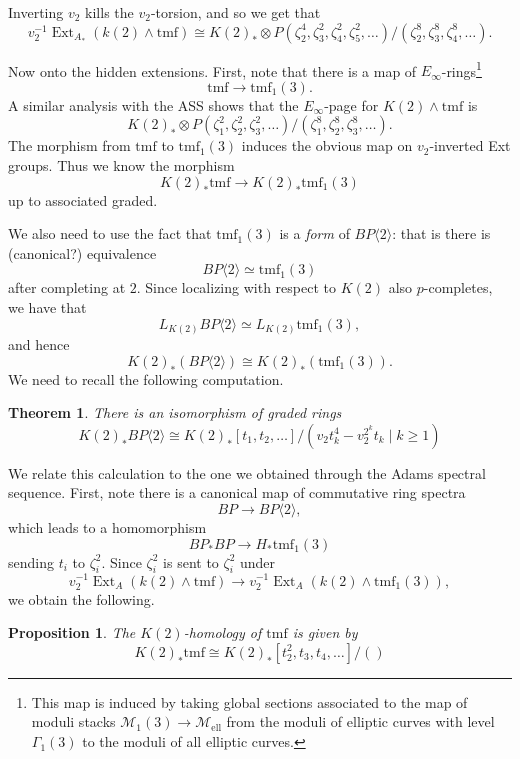\documentclass[12pt]{amsart}
\newcommand{\bra}[1]{\langle #1 \rangle}
\newcommand{\tBP}[1]{BP\bra{#1}}
\newcommand{\tmf}{\mathrm{tmf}}
\DeclareMathOperator{\Ext}{Ext}
\newcommand{\Mell}{\mathscr{M}_{\text{ell}}}
\newcommand{\M}{\mathscr{M}}
\newtheorem{thm}[equation]{Theorem}
\newtheorem{prop}[equation]{Proposition}
\theoremstyle{definition}
\numberwithin{equation}{section}
\numberwithin{figure}{section}
\begin{document}
Inverting $v_2$ kills the $v_2$-torsion, and so we get that 
\[
v_2^{-1}\Ext_{A_*}(k(2)\wedge \tmf)\cong K(2)_*\otimes P(\zeta_2^4, \zeta_3^2, \zeta_4^2, \zeta_5^2, \ldots)/(\zeta_2^8, \zeta_3^8, \zeta_4^8, \ldots).
\]

Now onto the hidden extensions. First, note that there is a map of $E_\infty$-rings\footnote{This map is induced by taking global sections associated to the map of moduli stacks $\M_1(3)\to \Mell$ from the moduli of elliptic curves with level $\Gamma_1(3)$ to the moduli of all elliptic curves.}
\[
\tmf\to \tmf_1(3).
\]
A similar analysis with the ASS shows that the $E_\infty$-page for $K(2)\wedge \tmf$ is
\[
K(2)_*\otimes P(\zeta_1^2, \zeta_2^2, \zeta_3^2, \ldots)/(\zeta_1^8, \zeta_2^8, \zeta_3^8, \ldots).
\]
The morphism from $\tmf$ to $\tmf_1(3)$ induces the obvious map on $v_2$-inverted Ext groups. Thus we know the morphism
\[
K(2)_*\tmf\to K(2)_*\tmf_1(3)
\]
up to associated graded.

We also need to use the fact that $\tmf_1(3)$ is a \emph{form} of $\tBP{2}$: that is there is (canonical?) equivalence 
\[
\tBP{2}\simeq \tmf_1(3)
\]
after completing at $2$. Since localizing with respect to $K(2)$ also $p$-completes, we have that 
\[
L_{K(2)}\tBP{2}\simeq L_{K(2)}\tmf_1(3),
\]
and hence 
\[
K(2)_*(\tBP{2})\cong K(2)_*(\tmf_1(3)).
\]
We need to recall the following computation. 

\begin{thm}
		There is an isomorphism of graded rings
	\[
	K(2)_*\tBP{2}\cong K(2)_*[t_1, t_2, \ldots ]/(v_2t_k^{4}-v_2^{2^k}t_k\mid k\geq 1)
	\]
\end{thm}

We relate this calculation to the one we obtained through the Adams spectral sequence. First, note there is a canonical map of commutative ring spectra
\[
BP\to \tBP{2},
\]
which leads to a homomorphism
\[
BP_*BP\to H_*\tmf_1(3)
\]
sending $t_i$ to $\zeta_i^2$. Since $\zeta_i^2$ is sent to $\zeta_i^2$ under 
\[
v_2^{-1}\Ext_A(k(2)\wedge \tmf)\to v_2^{-1}\Ext_A(k(2)\wedge \tmf_1(3)),
\]
we obtain the following. 

\begin{prop}
	The $K(2)$-homology of $\tmf$ is given by 
	\[
	K(2)_*\tmf\cong K(2)_*[t_2^2, t_3, t_4, \ldots]/()
	\]
\end{prop}



\end{document}
